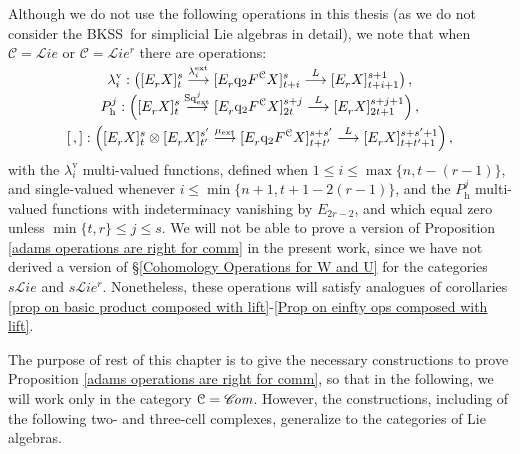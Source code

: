 \documentclass[11pt]{amsart} \renewcommand{\baselinestretch}{1.2}
\theoremstyle{plain}
\numberwithin{equation}{section} %
\theoremstyle{plain}
\numberwithin{equation}{chapter} %
\renewcommand{\to}{\longrightarrow}
\newcommand{\scrL}{\mathscr{L}}
\newcommand{\scrC}{\mathscr{C}}
\newcommand{\calc}{\mathcal{C}}
\newcommand{\quadgrad}[1]{\mathrm{q}_{#1}}
\newcommand{\Sq}{\mathrm{Sq}}
\newcommand{\algs}{{\scrC\!\textit{\normalfont\textit{om}}}}
\newcommand{\liealgs}{{\scrL\!\textit{ie}}}
\newcommand{\restliealgs}{{\scrL\!\textit{ie}^\textit{r}}}
\newcommand{\Edownup}[5]{[E_{#1}^{#2}#3]^{#4}_{#5}}
\newcommand{\uver}{^\mathrm{v}}
\newcommand{\dhor}{_\mathrm{h}}
\newcommand{\lambdav}{\lambda\uver}
\newcommand{\Ph}{P\dhor}
\newcommand{\BKSS}{BKSS}
\begin{document}
\begin{Operations on the Bousfield-Kan spectral sequence}
Although we do not use the following operations in this thesis (as we do not consider the \BKSS\ for simplicial Lie algebras in detail), we note that when $\calc=\liealgs$ or $\calc=\restliealgs$ there are operations:
\begin{gather*}
\lambdav_i:\left(\Edownup{r}{}{X}{s}{t} \smash{{}\overset{\lambda_i^\textup{ext}}{\to}{}} \Edownup{r}{}{\quadgrad{2}F^\calc X}{s}{t+i}\smash{{}\overset{L}{\to} {}}
\Edownup{r}{}{X}{s+1}{t+i+1}\right),
\\
\Ph^{j}:\left(\Edownup{r}{}{X}{s}{t}   \smash{{}\overset{\Sq^j_\textup{ext}}{\to}{}} \Edownup{r}{}{\quadgrad{2}F^\calc X}{s+j}{2t}\smash{{}\overset{L}{\to} {}}
\Edownup{r}{}{X}{s+j+1}{2t+1}\right),\\
[\,,]:\left(\Edownup{r}{}{X}{s}{t}\otimes \Edownup{r}{}{X}{s'}{t'}\smash{{}\overset{\mu_\textup{ext}}{\to}{}} \Edownup{r}{}{\quadgrad{2}F^\calc X}{s+s'}{t+t'}\smash{{}\overset{L}{\to} {}}
\Edownup{r}{}{X}{s+s'+1}{t+t'+1}\right),
\end{gather*}
with the $\lambdav_i$  multi-valued functions,  defined when $1\leq i\leq \max\{n,t-(r-1)\}$, and single-valued whenever $i\leq\min\{n+1,t+1-2(r-1)\}$, and the $\Ph^j$  multi-valued functions with indeterminacy vanishing by $E_{2r-2}$, and which equal zero unless $\min\{t,r\}\leq j\leq s$. We will not be able to prove a version of Proposition \ref{adams operations are right for comm} in the present work, since we have not derived a version of \S\ref{Cohomology Operations for W and U} for the categories $s\liealgs$ and $s\restliealgs$. Nonetheless, these operations will satisfy analogues of corollaries \ref{prop on basic product composed with lift}-\ref{Prop on einfty ops composed with lift}.

The purpose of rest of this chapter is to give the necessary constructions to  prove Proposition \ref{adams operations are right for comm}, so that in the following, we will work only in the category $\calc=\algs$. However, the constructions, including of the following two- and three-cell complexes, generalize to the categories of Lie algebras.




\end{Operations on the Bousfield-Kan spectral sequence}
\end{document}
